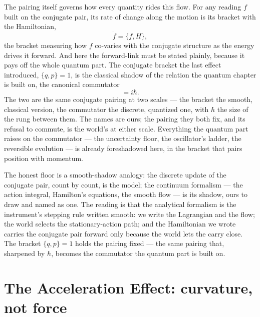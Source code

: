 The pairing itself governs how every quantity rides this flow. For any reading $f$ built on the conjugate
pair, its rate of change along the motion is its bracket with the Hamiltonian,
\begin{equation}
  \dot f = \{f, H\},
\end{equation}
the bracket measuring how $f$ co-varies with the conjugate structure as the energy drives it forward. And here
the forward-link must be stated plainly, because it pays off the whole quantum part. The conjugate bracket the
last effect introduced, $\{q, p\} = 1$, is the classical shadow of the relation the quantum chapter is built
on, the canonical commutator
\begin{equation}
  [x, p] = i\hbar .
\end{equation}
The two are the same conjugate pairing at two scales --- the bracket the smooth, classical version, the
commutator the discrete, quantized one, with $\hbar$ the size of the rung between them. The names are ours; the
pairing they both fix, and its refusal to commute, is the world's at either scale. Everything the quantum part
raises on the commutator --- the uncertainty floor, the oscillator's ladder, the reversible evolution --- is
already foreshadowed here, in the bracket that pairs position with momentum.

The honest floor is a smooth-shadow analogy: the discrete update of the conjugate pair, count by count, is the
model; the continuum formalism --- the action integral, Hamilton's equations, the smooth flow --- is its
shadow, ours to draw and named as one. The reading is that the analytical formalism is the instrument's
stepping rule written smooth: we write the Lagrangian and the flow; the world selects the stationary-action
path; and the Hamiltonian we wrote carries the conjugate pair forward only because the world lets the carry
close. The bracket $\{q, p\} = 1$ holds the pairing fixed --- the same pairing that, sharpened by $\hbar$,
becomes the commutator the quantum part is built on.

\section{The Acceleration Effect: curvature, not force}
\label{se:acceleration}

